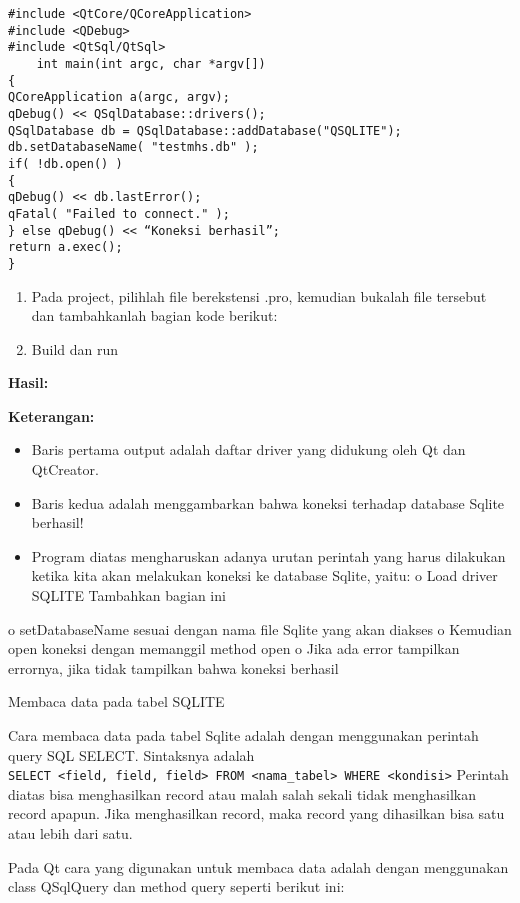 \begin{verbatim}
#include <QtCore/QCoreApplication>
#include <QDebug>
#include <QtSql/QtSql>
    int main(int argc, char *argv[])
{
QCoreApplication a(argc, argv);
qDebug() << QSqlDatabase::drivers();
QSqlDatabase db = QSqlDatabase::addDatabase("QSQLITE");
db.setDatabaseName( "testmhs.db" );
if( !db.open() )
{
qDebug() << db.lastError();
qFatal( "Failed to connect." );
} else qDebug() << “Koneksi berhasil”;
return a.exec();
}
\end{verbatim}

\begin{enumerate}
\def\labelenumi{\arabic{enumi}.}
\setcounter{enumi}{7}
\item
  Pada project, pilihlah file berekstensi .pro, kemudian bukalah file
  tersebut dan tambahkanlah bagian kode berikut:
\item
  Build dan run
\end{enumerate}

\textbf{Hasil:}

\textbf{Keterangan:}

\begin{itemize}
\tightlist
\item
  Baris pertama output adalah daftar driver yang didukung oleh Qt dan
  QtCreator.
\item
  Baris kedua adalah menggambarkan bahwa koneksi terhadap database
  Sqlite berhasil!
\item
  Program diatas mengharuskan adanya urutan perintah yang harus
  dilakukan ketika kita akan melakukan koneksi ke database Sqlite,
  yaitu: o Load driver SQLITE Tambahkan bagian ini
\end{itemize}

o setDatabaseName sesuai dengan nama file Sqlite yang akan diakses o
Kemudian open koneksi dengan memanggil method open o Jika ada error
tampilkan errornya, jika tidak tampilkan bahwa koneksi berhasil

Membaca data pada tabel SQLITE

Cara membaca data pada tabel Sqlite adalah dengan menggunakan perintah
query SQL SELECT. Sintaksnya adalah
\texttt{SELECT\ \textless{}field,\ field,\ field\textgreater{}\ FROM\ \textless{}nama\_tabel\textgreater{}\ WHERE\ \textless{}kondisi\textgreater{}}
Perintah diatas bisa menghasilkan record atau malah salah sekali tidak
menghasilkan record apapun. Jika menghasilkan record, maka record yang
dihasilkan bisa satu atau lebih dari satu.

Pada Qt cara yang digunakan untuk membaca data adalah dengan menggunakan
class QSqlQuery dan method query seperti berikut ini:

